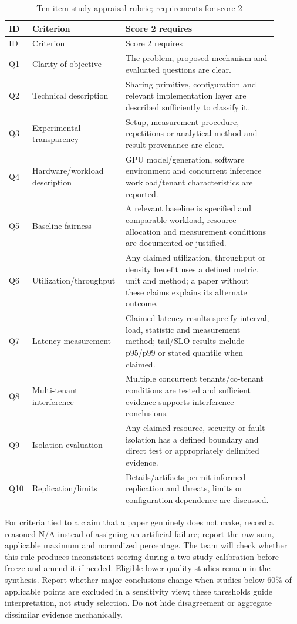\documentclass[12pt,a4paper]{article}
\begin{document}
\begin{longtable}{p{0.08\linewidth}p{0.28\linewidth}p{0.55\linewidth}}
\caption{Ten-item study appraisal rubric; requirements for score 2}\label{tab:quality}\\\toprule ID & Criterion & Score 2 requires\\\midrule\endfirsthead
\toprule ID & Criterion & Score 2 requires\\\midrule\endhead
Q1 & Clarity of objective & The problem, proposed mechanism and evaluated questions are clear.\\
Q2 & Technical description & Sharing primitive, configuration and relevant implementation layer are described sufficiently to classify it.\\
Q3 & Experimental transparency & Setup, measurement procedure, repetitions or analytical method and result provenance are clear.\\
Q4 & Hardware/workload description & GPU model/generation, software environment and concurrent inference workload/tenant characteristics are reported.\\
Q5 & Baseline fairness & A relevant baseline is specified and comparable workload, resource allocation and measurement conditions are documented or justified.\\
Q6 & Utilization/throughput & Any claimed utilization, throughput or density benefit uses a defined metric, unit and method; a paper without these claims explains its alternate outcome.\\
Q7 & Latency measurement & Claimed latency results specify interval, load, statistic and measurement method; tail/SLO results include p95/p99 or stated quantile when claimed.\\
Q8 & Multi-tenant interference & Multiple concurrent tenants/co-tenant conditions are tested and sufficient evidence supports interference conclusions.\\
Q9 & Isolation evaluation & Any claimed resource, security or fault isolation has a defined boundary and direct test or appropriately delimited evidence.\\
Q10 & Replication/limits & Details/artifacts permit informed replication and threats, limits or configuration dependence are discussed.\\\bottomrule
\end{longtable}

For criteria tied to a claim that a paper genuinely does not make, record a reasoned N/A instead of assigning an artificial failure; report the raw sum, applicable maximum and normalized percentage. The team will check whether this rule produces inconsistent scoring during a two-study calibration before freeze and amend it if needed. Eligible lower-quality studies remain in the synthesis. Report whether major conclusions change when studies below 60\% of applicable points are excluded in a sensitivity view; these thresholds guide interpretation, not study selection. Do not hide disagreement or aggregate dissimilar evidence mechanically.
\end{document}
